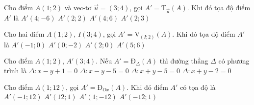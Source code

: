 \begin{ex}%
Cho điểm $A(1;2)$ và vec-tơ $\overrightarrow{u}=(3;4)$, gọi $A'=\text{T}_{\overrightarrow{u}}(A)$. Khi đó tọa độ điểm $A'$ là
	\choice
	{$ A'(4;-6) $}
	{$ A'(2;2) $}
	{\True $ A'(4;6) $}
	{$ A'(2;3) $}
\end{ex}
\begin{ex}%
Cho hai điểm $A(1;2)$, $I(3;4)$, gọi $A'=\text{V}_{(I;2)}(A)$. Khi đó tọa độ điểm $A'$ là	
	\choice
	{\True $ A'(-1;0) $}
	{$ A'(0;-2) $}
	{$ A'(2;0) $}
	{$ A'(5;6) $}
\end{ex}

\begin{ex}%
Cho điểm $A(1;2)$, $A'(3;4)$. Nếu $A'=\text{Đ}_{\Delta}(A)$ thì đường thẳng $\Delta$ có phương trình là
	\choice
	{$ \Delta:x-y+1=0 $}
	{$ \Delta:x-y-5=0 $}
	{\True $ \Delta:x+y-5=0 $}
	{$ \Delta:x+y-2=0 $}
\end{ex}
\begin{ex}%
Cho điểm $A(1;12)$, gọi $A'=\text{Đ}_{Ox}(A)$. Khi đó điểm $A'$ có tọa độ là
	\choice
	{$ A'(-1;12) $}
	{$ A'(12;1) $}
	{\True $ A'(1;-12) $}
	{$ A'(-12;1) $}
\end{ex}

